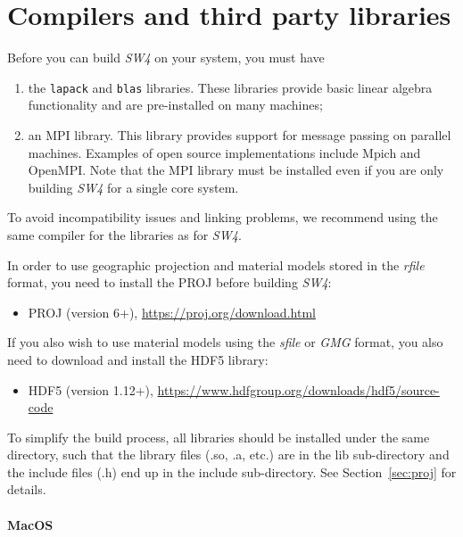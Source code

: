 \documentclass[11pt]{article}
\begin{document}
\section{Compilers and third party libraries}

Before you can build \emph{SW4} on your system, you must have
\begin{enumerate}
\item the \verb+lapack+ and \verb+blas+ libraries. These libraries provide basic linear algebra functionality and are pre-installed on many machines;
\item an MPI library. This library provides support for message passing on parallel
  machines. Examples of open source implementations include Mpich and OpenMPI. Note that the MPI library must be installed even if you are only building \emph{SW4} for a single core system.
\end{enumerate}

To avoid incompatibility issues and linking problems, we recommend using the same compiler for the libraries as for \emph{SW4}.

In order to use geographic projection and material models stored in the \emph{rfile} format, you need to install the PROJ before building \emph{SW4}:
\begin{itemize}
\item PROJ (version 6+), \url{https://proj.org/download.html}
\end{itemize}  
If you also wish to use material models using the \emph{sfile} or \emph{GMG} format, you also need to download and install the HDF5 library:
\begin{itemize}
\item HDF5 (version 1.12+), \url{https://www.hdfgroup.org/downloads/hdf5/source-code}
\end{itemize}
To simplify the build process, all libraries should be installed under the same directory, such that the library files (.so, .a, etc.) are in the lib sub-directory and the include files (.h) end up in the include sub-directory. See Section~\ref{sec:proj} for details.

\paragraph{MacOS}
\end{document}
